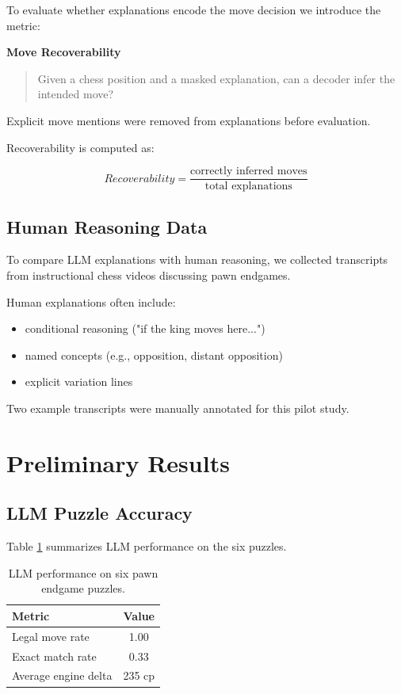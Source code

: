 \documentclass{article}
\begin{document}
To evaluate whether explanations encode the move decision we introduce the metric:

\textbf{Move Recoverability}

\begin{quote}
Given a chess position and a masked explanation, can a decoder infer the intended move?
\end{quote}

Explicit move mentions were removed from explanations before evaluation.

Recoverability is computed as:

\[
Recoverability = \frac{\text{correctly inferred moves}}{\text{total explanations}}
\]

\subsection{Human Reasoning Data}

To compare LLM explanations with human reasoning, we collected transcripts from instructional chess videos discussing pawn endgames.

Human explanations often include:

\begin{itemize}
\item conditional reasoning ("if the king moves here...")
\item named concepts (e.g., opposition, distant opposition)
\item explicit variation lines
\end{itemize}

Two example transcripts were manually annotated for this pilot study.

\section{Preliminary Results}

\subsection{LLM Puzzle Accuracy}

Table \ref{tab:accuracy} summarizes LLM performance on the six puzzles.

\begin{table}[h]
\centering
\begin{tabular}{lc}
\toprule
Metric & Value \\
\midrule
Legal move rate & 1.00 \\
Exact match rate & 0.33 \\
Average engine delta & 235 cp \\
\bottomrule
\end{tabular}
\caption{LLM performance on six pawn endgame puzzles.}
\label{tab:accuracy}
\end{table}
\end{document}
